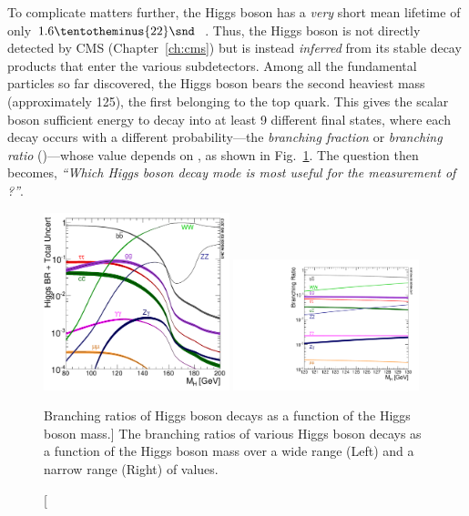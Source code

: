 To complicate matters further, the Higgs boson has a \emph{very} short mean lifetime of only $1.6 \tentotheminus{22}\snd$~\cite{particle_data_group_review_2020}.
Thus, the Higgs boson is not directly detected by CMS (Chapter~\ref{ch:cms}) but is instead \emph{inferred} from its stable decay products that enter the various subdetectors.
Among all the fundamental particles so far discovered, the Higgs boson bears the second heaviest mass (approximately 125\GeV), the first belonging to the top quark.
This gives the scalar boson sufficient energy to decay into at least 9 different final states, where each decay occurs with a different probability---the \emph{branching fraction} or \emph{branching ratio} (\br)---whose value depends on \mH, as shown in Fig.~\ref{fig:higgs_br}.
The question then becomes, \emph{``Which Higgs boson decay mode is most useful for the measurement of \mH?''}.
\begin{figure}[!htbp]
    \begin{center}
		\includegraphics[width=0.48\textwidth]{figures/higgsmassmeas/higgs_BR_80to200GeV.pdf}
		\includegraphics[width=0.48\textwidth]{figures/higgsmassmeas/higgs_BR_120to130GeV.pdf}
		\caption
			[Branching ratios of Higgs boson decays as a function of the Higgs boson mass.]
			{
            The branching ratios of various Higgs boson decays as a function of the Higgs boson mass
            over a wide range (Left) and a narrow range (Right) of values.
            }
		\label{fig:higgs_br}
	\end{center}
\end{figure} 
